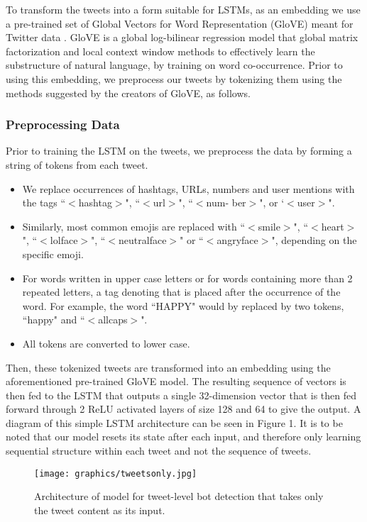 To transform the tweets into a form suitable for LSTMs, as an embedding we use a pre-trained set of Global Vectors for Word Representation (GloVE) meant for Twitter data \cite{pennington2014glove}. GloVE is a global log-bilinear regression model that global matrix factorization and local context window methods to effectively learn the substructure of natural language, by training on word co-occurrence.  Prior to using this embedding, we  preprocess our tweets by tokenizing them using the methods suggested by the creators of GloVE, as follows.

\subsubsection{Preprocessing Data}

Prior to training the LSTM on the tweets, we preprocess the data by forming a string of tokens from each tweet.
	\begin{itemize}
	\item We replace occurrences of hashtags, URLs, numbers and user mentions with the tags ``$<$hashtag$>$", ``$<$url$>$", ``$<$num- ber$>$", or `$<$user$>$".
    \item Similarly, most common emojis are replaced with ``$<$smile$>$", ``$<$heart$>$",  ``$<$lolface$>$", ``$<$neutralface$>$" or ``$<$angryface$>$", depending on the specific emoji.  
    \item For words written in upper case letters or for words containing more than 2 repeated letters, a tag denoting that is placed after the occurrence of the word. For example, the word ``HAPPY" would by replaced by two tokens, ``happy" and ``$<$allcaps$>$". 
    \item All tokens are converted to lower case. 
	\end{itemize}

Then, these tokenized tweets are  transformed into an embedding using the aforementioned pre-trained GloVE model. The resulting sequence of vectors is then fed to the LSTM that outputs a single 32-dimension vector that is then fed forward through 2 ReLU activated layers of size 128 and 64 to give the output. A diagram of this simple LSTM architecture can be seen in Figure 1. It is to be noted that our model resets its state after each input, and therefore only learning sequential structure within each tweet and not the sequence of tweets.  \par

\begin{figure}
\begin{center}
\texttt{[image: graphics/tweetsonly.jpg]} 
\caption{Architecture of model for tweet-level bot detection that takes only the tweet content as its input.}
\end{center}\vspace*{-.6cm}
\end{figure}


